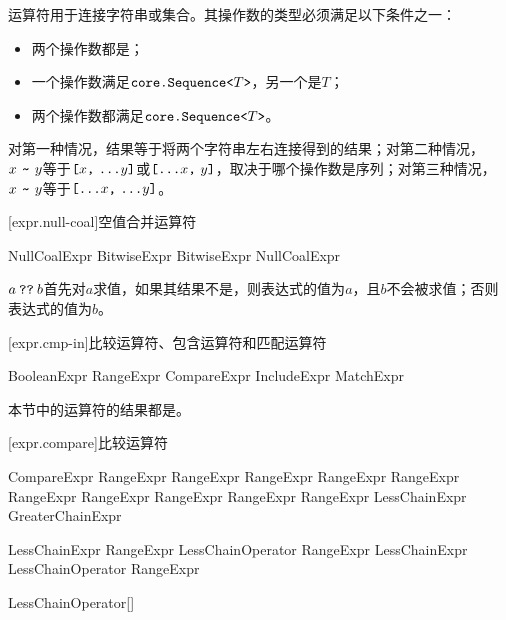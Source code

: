 \pnum
运算符\tcode{\~}用于连接字符串或集合。其操作数的类型必须满足以下条件之一：

\begin{itemize}
    \item 两个操作数都是；
    \item 一个操作数满足$\texttt{core.Sequence<}T\texttt{>}$，另一个是$T$；
    \item 两个操作数都满足$\texttt{core.Sequence<}T\texttt{>}$。
\end{itemize}

对第一种情况，结果等于将两个字符串左右连接得到的结果；对第二种情况，$x\ \tcode{\~}\ y$等于$\tcode{[}x\tcode{,}\ \tcode{...}y\tcode{]}$或$\tcode{[...}x\tcode{,}\ y\tcode{]}$，取决于哪个操作数是序列；对第三种情况，$x\ \tcode{\~}\ y$等于$\tcode{[...}x\tcode{,}\ \tcode{...}y\tcode{]}$。

[expr.null-coal]{空值合并运算符}

\begin{bnf}{NullCoalExpr}
    BitwiseExpr \br
    BitwiseExpr  NullCoalExpr
\end{bnf}

\pnum
$a\mathbin{\texttt{??}}b$首先对$a$求值，如果其结果不是，则表达式的值为$a$，且$b$不会被求值；否则表达式的值为$b$。

[expr.cmp-in]{比较运算符、包含运算符和匹配运算符}

\begin{bnf}{BooleanExpr}
    RangeExpr \br
    CompareExpr \br
    IncludeExpr \br
    MatchExpr
\end{bnf}

\pnum
本节中的运算符的结果都是。

[expr.compare]{比较运算符}

\begin{bnf}{CompareExpr}
    RangeExpr \terminal{!=} RangeExpr \br
    RangeExpr \terminal{!<} RangeExpr \br
    RangeExpr \terminal{!>} RangeExpr \br
    RangeExpr \terminal{<>} RangeExpr \br
    RangeExpr  RangeExpr \br
    LessChainExpr \br
    GreaterChainExpr
\end{bnf}

\begin{bnf}{LessChainExpr}
    RangeExpr LessChainOperator RangeExpr \br
    LessChainExpr LessChainOperator RangeExpr
\end{bnf}

\begin{bnf}{LessChainOperator}[\oneof]
    \terminal{< == <=}
\end{bnf}


